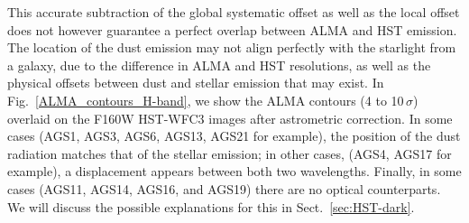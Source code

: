 \documentclass[longauth]{aa}
\begin{document}
This accurate subtraction of the global systematic offset as well as the local offset does not however guarantee a perfect overlap between ALMA and HST emission. The location of the dust emission may not align perfectly with the starlight from a galaxy, due to the difference in ALMA and HST resolutions, as well as the physical offsets between dust and stellar emission that may exist. In Fig.~\ref{ALMA_contours_H-band}, we show the ALMA contours (4 to 10\,$\sigma$) overlaid on the F160W HST-WFC3 images after astrometric correction. In some cases (AGS1, AGS3, AGS6, AGS13, AGS21 for example), the position of the dust radiation matches that of the stellar emission; in other cases, (AGS4, AGS17 for example), a displacement appears between both two wavelengths. Finally, in some cases (AGS11, AGS14, AGS16, and AGS19) there are no optical counterparts. We will discuss the possible explanations for this in Sect.~\ref{sec:HST-dark}.
 
\end{document}
